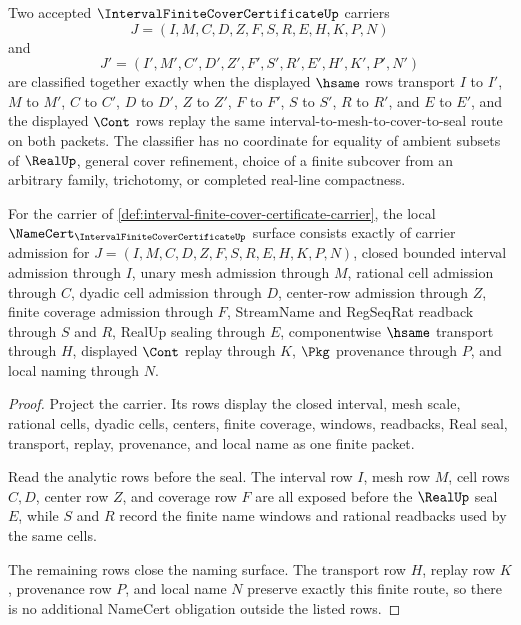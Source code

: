 \begin{definition}
\label{def:interval-finite-cover-certificate-classifier}
Two accepted $\IntervalFiniteCoverCertificateUp$ carriers
$$
J=(I,M,C,D,Z,F,S,R,E,H,K,P,N)
$$
and
$$
J'=(I',M',C',D',Z',F',S',R',E',H',K',P',N')
$$
are classified together exactly when the displayed $\hsame$ rows transport $I$ to $I'$, $M$ to $M'$, $C$ to $C'$, $D$ to $D'$, $Z$ to $Z'$, $F$ to $F'$, $S$ to $S'$, $R$ to $R'$, and $E$ to $E'$, and the displayed $\Cont$ rows replay the same interval-to-mesh-to-cover-to-seal route on both packets. The classifier has no coordinate for equality of ambient subsets of $\RealUp$, general cover refinement, choice of a finite subcover from an arbitrary family, trichotomy, or completed real-line compactness.
\end{definition}

\begin{theorem}
\label{thm:interval-finite-cover-certificate-namecert-obligations}
For the carrier of \autoref{def:interval-finite-cover-certificate-carrier}, the local $\NameCert_{\IntervalFiniteCoverCertificateUp}$ surface consists exactly of carrier admission for $J=(I,M,C,D,Z,F,S,R,E,H,K,P,N)$, closed bounded interval admission through $I$, unary mesh admission through $M$, rational cell admission through $C$, dyadic cell admission through $D$, center-row admission through $Z$, finite coverage admission through $F$, StreamName and RegSeqRat readback through $S$ and $R$, RealUp sealing through $E$, componentwise $\hsame$ transport through $H$, displayed $\Cont$ replay through $K$, $\Pkg$ provenance through $P$, and local naming through $N$.
\end{theorem}
\begin{proof}
Project the carrier. Its rows display the closed interval, mesh scale, rational cells, dyadic cells, centers, finite coverage, windows, readbacks, Real seal, transport, replay, provenance, and local name as one finite packet.

Read the analytic rows before the seal. The interval row $I$, mesh row $M$, cell rows $C,D$, center row $Z$, and coverage row $F$ are all exposed before the $\RealUp$ seal $E$, while $S$ and $R$ record the finite name windows and rational readbacks used by the same cells.

The remaining rows close the naming surface. The transport row $H$, replay row $K$, provenance row $P$, and local name $N$ preserve exactly this finite route, so there is no additional NameCert obligation outside the listed rows.
\end{proof}

